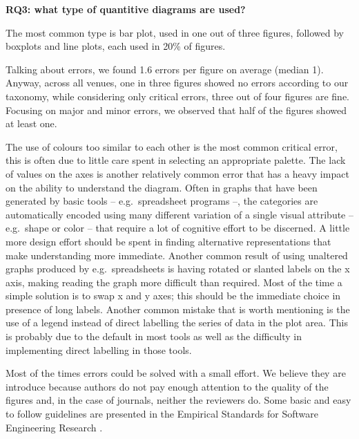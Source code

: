 \documentclass[
  10pt,
  conference,
]{IEEEtran}%
\begin{document}
\begin{tcolorbox}[enhanced jigsaw, arc=.35mm, breakable, left=2mm, colback=white, colframe=quarto-callout-note-color-frame, rightrule=.15mm, toprule=.15mm, opacityback=0, bottomrule=.15mm, leftrule=.75mm]

\vspace{-3mm}\textbf{RQ3: what type of quantitive diagrams are used?}\vspace{3mm}

The most common type is bar plot, used in one out of three figures,
followed by boxplots and line plots, each used in 20\% of figures.

\end{tcolorbox}

Talking about errors, we found 1.6 errors per figure on average (median
1). Anyway, across all venues, one in three figures showed no errors
according to our taxonomy, while considering only critical errors, three
out of four figures are fine. Focusing on major and minor errors, we
observed that half of the figures showed at least one.

The use of colours too similar to each other is the most common critical
error, this is often due to little care spent in selecting an
appropriate palette. The lack of values on the axes is another
relatively common error that has a heavy impact on the ability to
understand the diagram. Often in graphs that have been generated by
basic tools -- e.g.~spreadsheet programs --, the categories are
automatically encoded using many different variation of a single visual
attribute -- e.g.~shape or color -- that require a lot of cognitive
effort to be discerned. A little more design effort should be spent in
finding alternative representations that make understanding more
immediate. Another common result of using unaltered graphs produced by
e.g.~spreadsheets is having rotated or slanted labels on the x axis,
making reading the graph more difficult than required. Most of the time
a simple solution is to swap x and y axes; this should be the immediate
choice in presence of long labels. Another common mistake that is worth
mentioning is the use of a legend instead of direct labelling the series
of data in the plot area. This is probably due to the default in most
tools as well as the difficulty in implementing direct labelling in
those tools.

Most of the times errors could be solved with a small effort. We believe
they are introduce because authors do not pay enough attention to the
quality of the figures and, in the case of journals, neither the
reviewers do. Some basic and easy to follow guidelines are presented in
the Empirical Standards for Software Engineering Research
.
\end{document}
